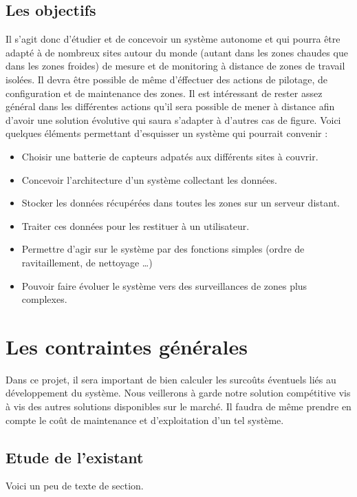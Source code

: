    \section{Les objectifs}
Il s'agit donc d'étudier et de concevoir un système autonome et qui pourra être adapté à de nombreux sites autour du monde (autant dans les zones chaudes que dans les zones froides) de mesure et de monitoring à distance de zones de travail isolées. Il devra être possible de même d'éffectuer des actions de pilotage, de configuration et de maintenance des zones. Il est intéressant de rester assez général dans les différentes actions qu'il sera possible de mener à distance afin d'avoir une solution évolutive qui saura s'adapter à d'autres cas de figure.
Voici quelques éléments permettant d'esquisser un système qui pourrait convenir :
\begin{itemize}
\item Choisir une batterie de capteurs adpatés aux différents sites à couvrir.
\item Concevoir l'architecture d'un système collectant les données.
\item Stocker les données récupérées dans toutes les zones sur un serveur distant.
\item Traiter ces données pour les restituer à un utilisateur.
\item Permettre d'agir sur le système par des fonctions simples (ordre de ravitaillement, de nettoyage …)
\item Pouvoir faire évoluer le système vers des surveillances de zones plus complexes.
\end{itemize}
    
    \chapter{Les contraintes générales}
Dans ce projet, il sera important de bien calculer les surcoûts éventuels liés au développement du système. Nous veillerons à garde notre solution compétitive vis à vis des autres solutions disponibles sur le marché. Il faudra de même prendre en compte le coût de maintenance et d'exploitation d'un tel système.
    \section{Etude de l'existant}
    Voici un peu de texte de section.

